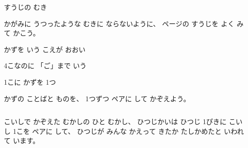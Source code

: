 \begin{tsumazuki}{すうじの むき}
\bkbatsu{}\hspace{3\zw}\bkmaru{}\par
かがみに うつったような むきに ならないように、 \pageref{bk:1-1:suuji}ページの すうじを よく みて かこう。
\end{tsumazuki}

\begin{tsumazuki}{かずを いう こえが おおい}
\noindent\begin{minipage}[c]{0.5\linewidth}
\bkbatsu\enspace 4こなのに 「ご」まで いう\par
\bkmaru\enspace 1こに かずを 1つ\par
\end{minipage}\hfill
\begin{minipage}[c]{0.46\linewidth}\centering
{}
\end{minipage}\par\vspace{4pt}
\noindent かずの ことばと ものを、 1つずつ ペアに して かぞえよう。
\end{tsumazuki}

\begin{column}{こいしで かぞえた むかしの ひと}
むかし、 ひつじかいは ひつじ 1ぴきに こいし 1こを ペアに して、 ひつじが みんな かえって きたか たしかめたと いわれて います。
\end{column}


